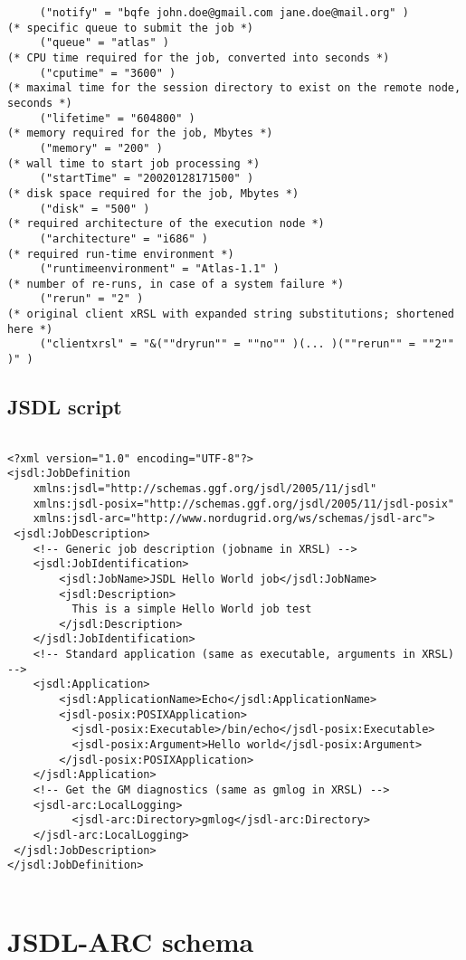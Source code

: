 \documentclass{book}
\begin{document}
\begin{verbatim}
     ("notify" = "bqfe john.doe@gmail.com jane.doe@mail.org" )
(* specific queue to submit the job *)
     ("queue" = "atlas" )
(* CPU time required for the job, converted into seconds *)
     ("cputime" = "3600" )
(* maximal time for the session directory to exist on the remote node, seconds *)
     ("lifetime" = "604800" )
(* memory required for the job, Mbytes *)
     ("memory" = "200" )
(* wall time to start job processing *)
     ("startTime" = "20020128171500" )
(* disk space required for the job, Mbytes *)
     ("disk" = "500" )
(* required architecture of the execution node *)
     ("architecture" = "i686" )
(* required run-time environment *)
     ("runtimeenvironment" = "Atlas-1.1" )
(* number of re-runs, in case of a system failure *)
     ("rerun" = "2" )
(* original client xRSL with expanded string substitutions; shortened here *)
     ("clientxrsl" = "&(""dryrun"" = ""no"" )(... )(""rerun"" = ""2"" )" )
  \end{verbatim}

  \section{JSDL script}

  \begin{verbatim}

<?xml version="1.0" encoding="UTF-8"?>
<jsdl:JobDefinition
    xmlns:jsdl="http://schemas.ggf.org/jsdl/2005/11/jsdl"
    xmlns:jsdl-posix="http://schemas.ggf.org/jsdl/2005/11/jsdl-posix"
    xmlns:jsdl-arc="http://www.nordugrid.org/ws/schemas/jsdl-arc">
 <jsdl:JobDescription>
    <!-- Generic job description (jobname in XRSL) -->
    <jsdl:JobIdentification>
        <jsdl:JobName>JSDL Hello World job</jsdl:JobName>
        <jsdl:Description>
          This is a simple Hello World job test
        </jsdl:Description>
    </jsdl:JobIdentification>
    <!-- Standard application (same as executable, arguments in XRSL) -->
    <jsdl:Application>
        <jsdl:ApplicationName>Echo</jsdl:ApplicationName>
        <jsdl-posix:POSIXApplication>
          <jsdl-posix:Executable>/bin/echo</jsdl-posix:Executable>
          <jsdl-posix:Argument>Hello world</jsdl-posix:Argument>
        </jsdl-posix:POSIXApplication>
    </jsdl:Application>
    <!-- Get the GM diagnostics (same as gmlog in XRSL) -->
    <jsdl-arc:LocalLogging>
	      <jsdl-arc:Directory>gmlog</jsdl-arc:Directory>
    </jsdl-arc:LocalLogging>
 </jsdl:JobDescription>
</jsdl:JobDefinition>


  \end{verbatim}


  \chapter{JSDL-ARC schema}
  \label{sec:jsdl-arc-schema}

  


  
  \printindex
\end{document}
